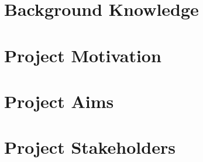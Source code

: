 \section{Background Knowledge}
\label{background_knowledge}


\section{Project Motivation}
\label{project_motivation}


\section{Project Aims}
\label{project_aims}


\section{Project Stakeholders}
\label{project_stakeholders}

